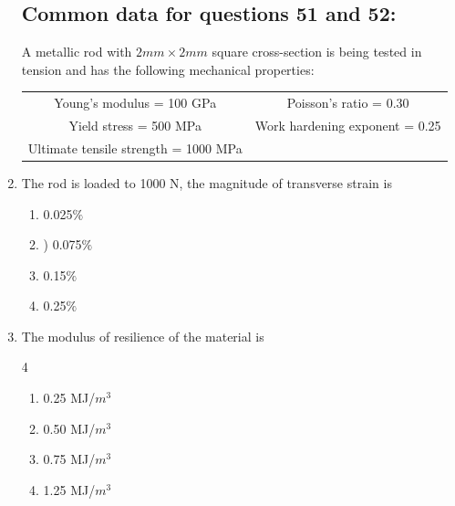 \documentclass[journal]{IEEEtran}
\theoremstyle{remark}
\begin{document}
\begin{enumerate}
\subsection*{Common data for questions 51 and 52:}
A metallic rod with $2 mm \times 2 mm$ square cross-section is being tested in tension and has the following mechanical properties: \\
\begin{center}
    \begin{tabular}{c c}
      Young's modulus = 100 GPa   & Poisson's ratio = 0.30 \\
     Yield stress = 500 MPa   & Work hardening exponent = 0.25\\
     Ultimate tensile strength = 1000 MPa&  
    \end{tabular}
\end{center}
\item   The rod is loaded to 1000 N, the magnitude of transverse strain is
\hfill{}
\begin{multicols}{4}
\begin{enumerate}
\item   0.025$\%$
\item) 0.075$\%$
\item  0.15$\%$
\item 0.25$\%$
\end{enumerate}
\end{multicols}

\item   The modulus of resilience of the material is
\hfill{}

\begin {multicols}{4}
\begin{enumerate}
\item  0.25 MJ/$m^3$
\item  0.50 MJ/$m^3$
\item  0.75 MJ/$m^3$
\item  1.25 MJ/$m^3$
\end{enumerate}
\end{multicols}

\end{enumerate}
\end{document}
